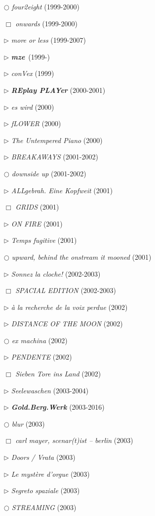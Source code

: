 \documentclass[a4paper,12pt]{article}
\newcommand{\maze}[0]{\emph{m\symbol{64}ze\textdegree2}}
\begin{document}
\begin{itemize}
\item[$\bigcirc$] \emph{four2eight} (1999-2000)
\item[$\Box$] \emph{onwards} (1999-2000)
\item[$\rhd$] \emph{more or less} (1999-2007)
\item[$\rhd$] \textbf{\maze}~(1999-)
\item[$\rhd$] \emph{conVex} (1999)
\item[$\rhd$] \textbf{\emph{REplay PLAYer}} (2000-2001)
\item[$\rhd$] \emph{es wird} (2000)
\item[$\rhd$] \emph{fLOWER} (2000)
\item[$\rhd$] \emph{The Untempered Piano} (2000)
\item[$\rhd$] \emph{BREAKAWAYS} (2001-2002)
\item[$\bigcirc$] \emph{downside up} (2001-2002)
\item[$\rhd$] \emph{ALLgebrah. Eine Kopfweit} (2001)
\item[$\Box$] \emph{GRIDS} (2001)
\item[$\rhd$] \emph{ON FIRE} (2001)
\item[$\rhd$] \emph{Temps fugitive} (2001)
\item[$\bigcirc$] \emph{upward, behind the onstream it mooned} (2001)
\item[$\rhd$] \emph{Sonnez la cloche!} (2002-2003)
\item[$\Box$] \emph{SPACIAL EDITION} (2002-2003)
\item[$\rhd$] \emph{à la recherche de la voix perdue} (2002)
\item[$\rhd$] \emph{DISTANCE OF THE MOON} (2002)
\item[$\bigcirc$] \emph{ex machina} (2002)
\item[$\rhd$] \emph{PENDENTE} (2002)
\item[$\Box$] \emph{Sieben Tore ins Land} (2002)
\item[$\rhd$] \emph{Seelewaschen} (2003-2004)
\item[$\rhd$] \textbf{\emph{Gold.Berg.Werk}} (2003-2016)
\item[$\bigcirc$] \emph{blur} (2003)
\item[$\Box$] \emph{carl mayer, scenar(t)ist – berlin} (2003)
\item[$\rhd$] \emph{Doors / Vrata} (2003)
\item[$\rhd$] \emph{Le mystère d'orgue} (2003)
\item[$\rhd$] \emph{Segreto spaziale} (2003)
\item[$\bigcirc$] \emph{STREAMING} (2003)

\end{itemize}
\end{document}
